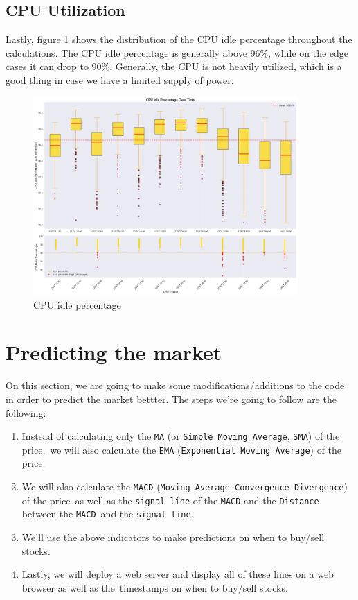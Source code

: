 \documentclass{article}
\begin{document}
\subsection{CPU Utilization}
Lastly, figure \ref{alg:delay-cpu} shows the distribution of the CPU idle percentage throughout the calculations.
The CPU idle percentage is generally above 96\%, while on the edge cases it can drop to 90\%. Generally,
the CPU is not heavily utilized, which is a good thing in case we have a limited supply of power.

\begin{figure}[H]
    \centering
    \includegraphics[width=0.9\textwidth]{boxplot-CPU.png}
    \caption{CPU idle percentage}
    \label{alg:delay-cpu}
\end{figure}


\section{Predicting the market}
On this section, we are going to make some modifications/additions to the code in order to predict the market
bettter. The steps we're going to follow are the following:

\begin{enumerate}
    \item Instead of calculating only the \texttt{MA} (or \texttt{Simple Moving Average}, \texttt{SMA}) of the price,\
    we will also calculate the \texttt{EMA} (\texttt{Exponential Moving Average}) of the price.
    \item We will also calculate the \texttt{MACD} (\texttt{Moving Average Convergence Divergence}) of the price\
    as well as the \texttt{signal line} of the \texttt{MACD} and the \texttt{Distance} between the \texttt{MACD}\
    and the \texttt{signal line}.
    \item We'll use the above indicators to make predictions on when to buy/sell stocks.
    \item Lastly, we will deploy a web server and display all of these lines on a web browser as well as the\
    timestamps on when to buy/sell stocks.
\end{enumerate}
\end{document}
